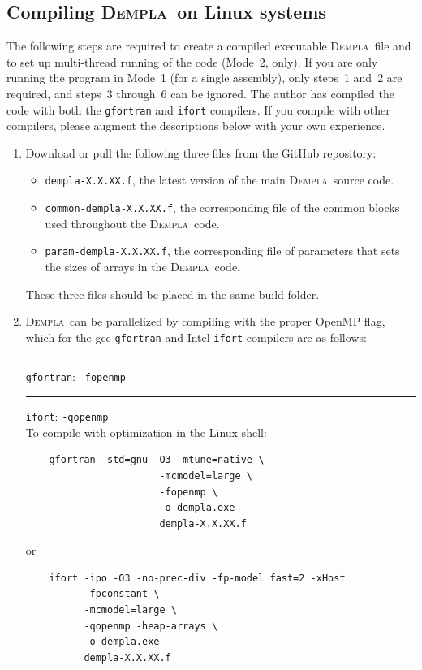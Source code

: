 \documentclass[letterpaper,11pt]{article}
\newcommand{\Dempla}{\textsc{Dempla}}
\begin{document}
\subsection{Compiling \Dempla\ on Linux systems}\label{sec:UnixSystems}
%
The following steps are required
to create a compiled executable \Dempla\ file and to set up
multi-thread running of the code (Mode~2, only).
If you are only running the program in Mode~1
(for a single assembly), only steps~1 and~2 are required,
and steps~3 through~6 can be ignored.
The author has compiled the code with both the \texttt{gfortran}
and \texttt{ifort} compilers.
If you compile with other compilers, please augment the descriptions
below with your own experience.
%
\begin{enumerate}
\item
Download or pull the following three files from the GitHub
repository:
  \begin{itemize}
  	\item
  	  \texttt{dempla-X.X.XX.f}, the latest version of the 
  	  main \Dempla\ source code.
  	\item
  	  \texttt{common-dempla-X.X.XX.f}, the corresponding file of
  	  the common blocks used throughout the \Dempla\ code.
  	\item
  	  \texttt{param-dempla-X.X.XX.f}, the corresponding file of
  	  parameters that sets the sizes of arrays in the \Dempla\ code.
  \end{itemize}
These three files should be placed in the same build folder.
%
\item\label{item:compile}
\Dempla\ can be parallelized by compiling with the proper OpenMP flag,
which for the gcc \texttt{gfortran} and Intel \texttt{ifort} compilers
are as follows:\\
\rule{3ex}{0ex} \texttt{gfortran}: \texttt{-fopenmp}\\
\rule{3ex}{0ex} \texttt{ifort}:    \texttt{-qopenmp}\\
To compile with optimization in the Linux shell:
\begin{verbatim}
    gfortran -std=gnu -O3 -mtune=native \
                       -mcmodel=large \
                       -fopenmp \
                       -o dempla.exe
                       dempla-X.X.XX.f
\end{verbatim}
or
\begin{verbatim}
    ifort -ipo -O3 -no-prec-div -fp-model fast=2 -xHost
          -fpconstant \
          -mcmodel=large \
          -qopenmp -heap-arrays \
          -o dempla.exe
          dempla-X.X.XX.f

\end{verbatim}
\end{enumerate}
\end{document}
